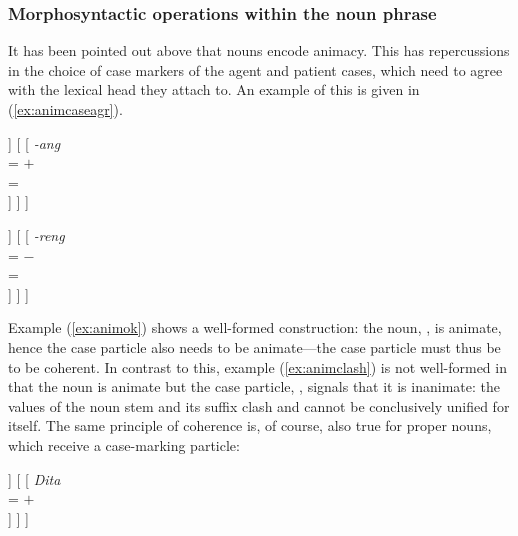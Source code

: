 \subsubsection{Morphosyntactic operations within the noun phrase}

It has been pointed out above that nouns encode animacy. This has repercussions
in the choice of case markers of the agent and patient cases, which need to
agree with the lexical head they attach to. An example of this is given in 
(\ref{ex:animcaseagr}).

\pex\label{ex:animcaseagr}
\a\label{ex:animok} %
\begin{forest}
[\anno{\xhead{N}}
	[\anno{N\tsub{stem}}
		[{%
			\textit{gan} \\
			\ups{\Anim} = $+$ \\
		}]
	]
	[
		[{%
			\textit{-ang} \\
			\ups{\Anim} = $+$ \\
			\ups{\Case} = \Aarg{} \\
		}]
	]
]
\end{forest}

\a\label{ex:animclash} %
\ljudge*\begin{forest}
[\anno{\xhead{N}}
	[\anno{N\tsub{stem}}
		[{%
			\textit{gan} \\
			\ups{\Anim} = $+$ \\
		}]
	]
	[
		[{%
			\textit{-reng} \\
			\ups{\Anim} = $-$ \\
			\ups{\Case} = \Aarg{} \\
		}]
	]
]
\end{forest}
\xe

Example (\ref{ex:animok}) shows a well-formed construction: the noun,
, is animate, hence the case particle also needs to be 
animate---the case particle must thus be  to be coherent. In
contrast to this, example (\ref{ex:animclash}) is not well-formed in that the
noun is animate but the case particle, , signals that it is
inanimate: the \Anim{} values of the noun stem and its suffix clash and cannot
be conclusively unified for  itself. The same principle of coherence
is, of course, also true for proper nouns, which receive a case-marking
particle:

\pex\label{ex:animcaseagrname}
\a\label{ex:animokname} %
\begin{forest}
[\anno{\xhead{N}}
	[\anno{Cl}
		[{%
			\textit{ang} \\
			\ups{\Anim} = $+$ \\
			\ups{\Case} = \Aarg{} \\
		}]
	]
	[
		[{%
			\textit{Dita} \\
			\ups{\Anim} = $+$ \\
		}]
	]
]
\end{forest}

